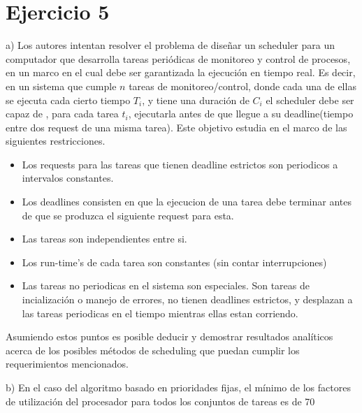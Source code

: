 \section{Ejercicio 5}


a) Los autores intentan resolver el problema de diseñar un  scheduler para un computador que desarrolla tareas periódicas de monitoreo y control de procesos, en un marco en el cual debe ser garantizada la ejecución en tiempo real.  Es decir, en un sistema que cumple $n$ tareas de monitoreo/control, donde cada una de ellas se ejecuta cada cierto tiempo $T_i$, y tiene una duración de $C_i$ el scheduler debe ser capaz de , para cada tarea $t_i$, ejecutarla antes de que llegue a su deadline(tiempo entre dos request de una misma tarea). Este objetivo estudia en el marco de las siguientes restricciones.
\begin{itemize} 
\item Los requests para las tareas que tienen deadline estrictos son periodicos a intervalos constantes.  
\item Los deadlines consisten en que la ejecucion de una tarea debe terminar antes de que se produzca el siguiente request para esta.
\item Las tareas son independientes entre si.
\item Los run-time's de cada tarea son constantes (sin contar interrupciones)
\item Las tareas no periodicas en el sistema son especiales. Son tareas de incialización o manejo de errores, no tienen deadlines estrictos, y desplazan a las tareas periodicas en el tiempo mientras ellas estan corriendo.
\end{itemize} 
Asumiendo estos puntos es posible deducir y demostrar resultados analíticos acerca de los posibles métodos de scheduling que puedan cumplir los requerimientos mencionados.

b) En el caso del algoritmo basado en prioridades fijas, el mínimo de los factores de utilización del procesador para todos los conjuntos de tareas es de 70%


